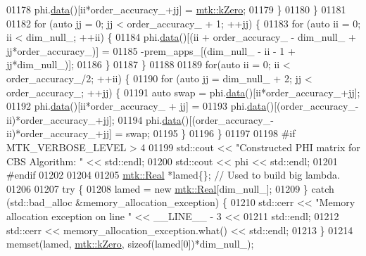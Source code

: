 \begin{DoxyCode}
{{01178         phi.\hyperlink{classmtk_1_1DenseMatrix_a0c33b8a9e01d157c61ddbdf807c25d84}{data}()[ii*order\_accuracy\_+jj] = \hyperlink{group__c01-roots_ga59a451a5fae30d59649bcda274fea271}{mtk::kZero};
01179       \}
01180     \}
01181 
01182     \textcolor{keywordflow}{for} (\textcolor{keyword}{auto} jj = 0; jj < order\_accuracy\_ + 1; ++jj) \{
01183       \textcolor{keywordflow}{for} (\textcolor{keyword}{auto} ii = 0; ii < dim\_null\_; ++ii) \{
01184         phi.\hyperlink{classmtk_1_1DenseMatrix_a0c33b8a9e01d157c61ddbdf807c25d84}{data}()[(ii + order\_accuracy\_ - dim\_null\_ + jj*order\_accuracy\_)] =
01185           -prem\_apps\_[(dim\_null\_ - ii - 1 + jj*dim\_null\_)];
01186       \}
01187     \}
01188 
01189     \textcolor{keywordflow}{for}(\textcolor{keyword}{auto} ii = 0; ii < order\_accuracy\_/2; ++ii) \{
01190       \textcolor{keywordflow}{for} (\textcolor{keyword}{auto} jj = dim\_null\_ + 2; jj < order\_accuracy\_; ++jj) \{
01191         \textcolor{keyword}{auto} swap = phi.\hyperlink{classmtk_1_1DenseMatrix_a0c33b8a9e01d157c61ddbdf807c25d84}{data}()[ii*order\_accuracy\_+jj];
01192         phi.\hyperlink{classmtk_1_1DenseMatrix_a0c33b8a9e01d157c61ddbdf807c25d84}{data}()[ii*order\_accuracy\_ + jj] =
01193           phi.\hyperlink{classmtk_1_1DenseMatrix_a0c33b8a9e01d157c61ddbdf807c25d84}{data}()[(order\_accuracy\_-ii)*order\_accuracy\_+jj];
01194         phi.\hyperlink{classmtk_1_1DenseMatrix_a0c33b8a9e01d157c61ddbdf807c25d84}{data}()[(order\_accuracy\_-ii)*order\_accuracy\_+jj] = swap;
01195       \}
01196     \}
01197 
01198 \textcolor{preprocessor}{    #if MTK\_VERBOSE\_LEVEL > 4}
01199     std::cout << \textcolor{stringliteral}{"Constructed PHI matrix for CBS Algorithm: "} << std::endl;
01200     std::cout << phi << std::endl;
01201 \textcolor{preprocessor}{    #endif}
01202 
01204 
01205     \hyperlink{group__c01-roots_gac080bbbf5cbb5502c9f00405f894857d}{mtk::Real} *lamed\{\};  \textcolor{comment}{// Used to build big lambda.}
01206 
01207     \textcolor{keywordflow}{try} \{
01208       lamed = \textcolor{keyword}{new} \hyperlink{group__c01-roots_gac080bbbf5cbb5502c9f00405f894857d}{mtk::Real}[dim\_null\_];
01209     \} \textcolor{keywordflow}{catch} (std::bad\_alloc &memory\_allocation\_exception) \{
01210       std::cerr << \textcolor{stringliteral}{"Memory allocation exception on line "} << \_\_LINE\_\_ - 3 <<
01211         std::endl;
01212       std::cerr << memory\_allocation\_exception.what() << std::endl;
01213     \}
01214     memset(lamed, \hyperlink{group__c01-roots_ga59a451a5fae30d59649bcda274fea271}{mtk::kZero}, \textcolor{keyword}{sizeof}(lamed[0])*dim\_null\_);
}}
\end{DoxyCode}
